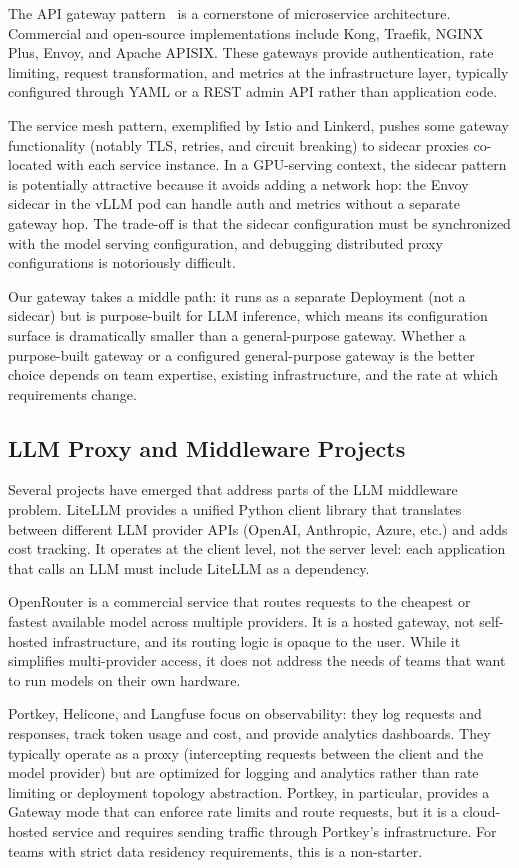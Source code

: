 \documentclass[10pt,journal]{IEEEtran}
\begin{document}
The API gateway pattern~\cite{newman2015building} is a cornerstone of microservice architecture. Commercial and open-source implementations include Kong, Traefik, NGINX Plus, Envoy, and Apache APISIX. These gateways provide authentication, rate limiting, request transformation, and metrics at the infrastructure layer, typically configured through YAML or a REST admin API rather than application code.

The service mesh pattern, exemplified by Istio and Linkerd, pushes some gateway functionality (notably TLS, retries, and circuit breaking) to sidecar proxies co-located with each service instance. In a GPU-serving context, the sidecar pattern is potentially attractive because it avoids adding a network hop: the Envoy sidecar in the vLLM pod can handle auth and metrics without a separate gateway hop. The trade-off is that the sidecar configuration must be synchronized with the model serving configuration, and debugging distributed proxy configurations is notoriously difficult.

Our gateway takes a middle path: it runs as a separate Deployment (not a sidecar) but is purpose-built for LLM inference, which means its configuration surface is dramatically smaller than a general-purpose gateway. Whether a purpose-built gateway or a configured general-purpose gateway is the better choice depends on team expertise, existing infrastructure, and the rate at which requirements change.

\subsection{LLM Proxy and Middleware Projects}

Several projects have emerged that address parts of the LLM middleware problem. LiteLLM provides a unified Python client library that translates between different LLM provider APIs (OpenAI, Anthropic, Azure, etc.) and adds cost tracking. It operates at the client level, not the server level: each application that calls an LLM must include LiteLLM as a dependency.

OpenRouter is a commercial service that routes requests to the cheapest or fastest available model across multiple providers. It is a hosted gateway, not self-hosted infrastructure, and its routing logic is opaque to the user. While it simplifies multi-provider access, it does not address the needs of teams that want to run models on their own hardware.

Portkey, Helicone, and Langfuse focus on observability: they log requests and responses, track token usage and cost, and provide analytics dashboards. They typically operate as a proxy (intercepting requests between the client and the model provider) but are optimized for logging and analytics rather than rate limiting or deployment topology abstraction. Portkey, in particular, provides a Gateway mode that can enforce rate limits and route requests, but it is a cloud-hosted service and requires sending traffic through Portkey's infrastructure. For teams with strict data residency requirements, this is a non-starter.
\end{document}
